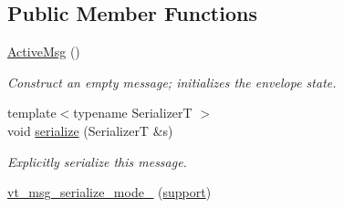 \subsection*{Public Member Functions}
\begin{DoxyCompactItemize}
\item 
\hyperlink{structvt_1_1messaging_1_1_active_msg_a5fd6a7b78c86b8f1e36198142990a4c4}{Active\+Msg} ()
\begin{DoxyCompactList}\small\item\em Construct an empty message; initializes the envelope state. \end{DoxyCompactList}\item 
{\footnotesize template$<$typename SerializerT $>$ }\\void \hyperlink{structvt_1_1messaging_1_1_active_msg_a758f02bef5991c48d6c9a56c30ca7ad9}{serialize} (SerializerT \&s)
\begin{DoxyCompactList}\small\item\em Explicitly serialize this message. \end{DoxyCompactList}\item 
\hyperlink{structvt_1_1messaging_1_1_active_msg_a97b214f27e477ea5951a2d697f2256e7}{vt\+\_\+msg\+\_\+serialize\+\_\+mode\+\_\+} (\hyperlink{namespacevt_1_1messaging_a436c5b9fc7f591e5978a136999cb9ef8a434990c8a25d2be94863561ae98bd682}{support})
\end{DoxyCompactItemize}
